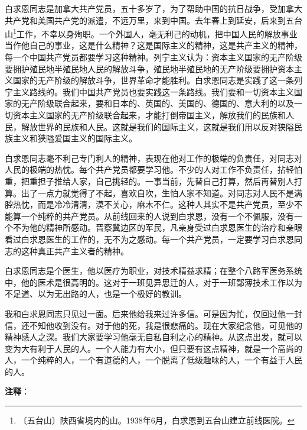 \documentclass[12pt,UTF-8,openany]{ctexbook}
\begin{document}
\begin{normalsize}
    
    白求恩同志是加拿大共产党员，五十多岁了，为了帮助中国的抗日战争，受加拿大共产党和美国共产党的派遣，不远万里，来到中国。去年春上到延安，后来到五台山\footnote{〔五台山〕陕西省境内的山。1938年6月，白求恩到五台山建立前线医院。}工作，不幸以身殉职。一个外国人，毫无利己的动机，把中国人民的解放事业当作他自己的事业，这是什么精神？这是国际主义的精神，这是共产主义的精神，每一个中国共产党员都要学习这种精神。列宁主义认为：资本主义国家的无产阶级要拥护殖民地半殖民地人民的解放斗争，殖民地半殖民地的无产阶级要拥护资本主义国家的无产阶级的解放斗争，世界革命才能胜利。白求恩同志是实践了这一条列宁主义路线的。我们中国共产党员也要实践这一条路线。我们要和一切资本主义国家的无产阶级联合起来，要和日本的、英国的、美国的、德国的、意大利的以及一切资本主义国家的无产阶级联合起来，才能打倒帝国主义，解放我们的民族和人民，解放世界的民族和人民。这就是我们的国际主义，这就是我们用以反对狭隘民族主义和狭隘爱国主义的国际主义。
    
    白求恩同志毫不利己专门利人的精神，表现在他对工作的极端的负责任，对同志对人民的极端的热忱。每个共产党员都要学习他。不少的人对工作不负责任，拈轻怕重，把重担子推给人家，自己挑轻的。一事当前，先替自己打算，然后再替别人打算。出了一点力就觉得了不起，喜欢自吹，生怕人家不知道。对同志对人民不是满腔热忱，而是冷冷清清，漠不关心，麻木不仁。这种人其实不是共产党员，至少不能算一个纯粹的共产党员。从前线回来的人说到白求恩，没有一个不佩服，没有一个不为他的精神所感动。晋察冀边区的军民，凡亲身受过白求恩医生的治疗和亲眼看过白求恩医生的工作的，无不为之感动。每一个共产党员，一定要学习白求恩同志的这种真正共产主义者的精神。
    
    白求恩同志是个医生，他以医疗为职业，对技术精益求精；在整个八路军医务系统中，他的医术是很高明的。这对于一班见异思迁的人，对于一班鄙薄技术工作以为不足道、以为无出路的人，也是一个极好的教训。
    
    我和白求恩同志只见过一面。后来他给我来过许多信。可是因为忙，仅回过他一封信，还不知他收到没有。对于他的死，我是很悲痛的。现在大家纪念他，可见他的精神感人之深。我们大家要学习他毫无自私自利之心的精神。从这点出发，就可以变为大有利于人民的人。一个人能力有大小，但只要有这点精神，就是一个高尚的人，一个纯粹的人，一个有道德的人，一个脱离了低级趣味的人，一个有益于人民的人。
    
\end{normalsize}


\newpage

\textbf{注释}：

\vspace{-1em}
\end{document}
